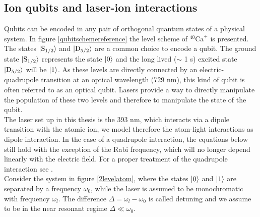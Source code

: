 \subsection{Ion qubits and laser-ion interactions}
\label{laserioninteractions}
Qubits can be encoded in any pair of orthogonal quantum states of a physical system. %
In figure \ref{qubitschemereference} the level scheme of $^{40}\text{Ca}^+$ is presented. The states $\ket{\text{S}_{1/2}}$ and $\ket{\text{D}_{5/2}}$ are a common choice to encode a qubit. The ground state $\ket{\text{S}_{1/2}}$ represents the state $\ket{0}$ and the long lived ($\sim$ 1 s) excited state $\ket{\text{D}_{5/2}}$ will be $\ket{1}$. As these levels are directly connected by an electric-quadrupole transition at an optical wavelength (729 nm), this kind of qubit is often referred to as an optical qubit.
Lasers provide a way to directly manipulate the population of these two levels and therefore to manipulate the state of the qubit.\\
The laser set up in this thesis is the 393 nm, which interacts via a dipole transition with the atomic ion, we model therefore the atom-light interactions as dipole interaction. In the case of a quadrupole interaction, the equations below still hold with the exception of the Rabi frequency, which will no longer depend linearly with the electric field. For a proper treatment of the quadrupole interaction see \cite{ross}.\\
Consider the system in figure \ref{2levelatom}, where the states $\ket{0}$ and $\ket{1}$ are separated by a frequency $\omega_0$, while the laser is assumed to be monochromatic with frequency $\omega_l$. The difference $\Delta = \omega_l -\omega_0$ is called detuning and we assume to be in the near resonant regime $\Delta \ll \omega_0$. %
